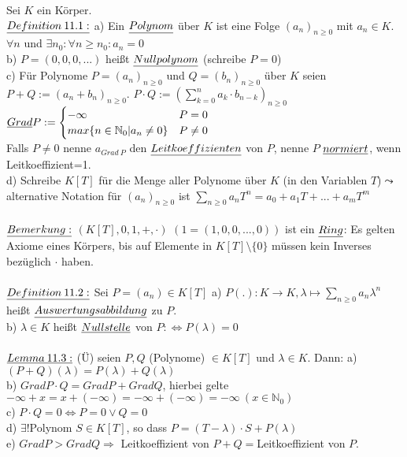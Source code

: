 \documentclass[fleqn, a4paper, 11pt]{scrartcl}
\newcommand{\NN}{\mathbb{N}}
\theoremstyle{definition}
\begin{document}
Sei $K$ ein Körper.\\
$\uline{Definition\:11.1:}$ a) Ein $\uline{Polynom}$ über $K$ ist eine Folge $(a_n)_{n\geq 0}$ mit $a_n\in K$. $\forall n$ und $\exists n_0 :\forall n\geq n_0: a_n=0$\\
b) $P=(0,0,0,...)$ heißt $\uline{Nullpolynom}$ (schreibe $P=0$)\\
c) Für Polynome $P=(a_n)_{n\geq 0}$ und $Q=(b_n)_{n\geq 0}$ über $K$ seien $P+Q:=(a_n +b_n)_{n\geq 0}$. $P\cdot Q:=(\sum\limits_{k=0}^n a_k\cdot b_{n-k})_{n\geq 0}$\\
$\uline{Grad}P:=\begin{cases}
	-\infty & P=0 \\
	max\{n\in\NN_0 | a_n\neq 0\} & P\neq 0
\end{cases}$\\
Falls $P\neq 0$ nenne $a_{Grad\:P}$ den $\uline{Leitkoeffizienten}$ von $P$, nenne $P$ $\uline{normiert}$, wenn Leitkoeffizient=1.\\
d) Schreibe $K[T]$ für die Menge aller Polynome über $K$ (in den Variablen $T$)$\leadsto$ alternative Notation für $(a_n)_{n\geq 0}$ ist $\sum\limits_{n\geq 0} a_n T^n =a_0 + a_1 T+...+a_m T^m$\\
\\
$\uline{Bemerkung:}$ $(K[T],0,1,+,\cdot)$ $(1=(1,0,0,...,0))$ ist ein $\uline{Ring}$: Es gelten Axiome eines Körpers, bis auf Elemente in $K[T]\setminus\{0\}$ müssen kein Inverses bezüglich $\cdot$ haben.\\
\\
$\uline{Definition\:11.2:}$ Sei $P=(a_n)\in K[T]$ a) $P(.):K\rightarrow K,\lambda\mapsto\sum\limits_{n\geq 0} a_n\lambda^n$ heißt $\uline{Auswertungsabbildung}$ zu $P$.\\
b) $\lambda\in K$ heißt $\uline{Nullstelle}$ von $P:\Leftrightarrow P(\lambda)=0$\\
\\
$\uline{Lemma\:11.3:}$ (\"U) seien $P,Q$ (Polynome) $\in K[T]$ und $\lambda\in K$. Dann: a) $(P+Q)(\lambda)=P(\lambda)+Q(\lambda)$\\
b) $Grad P\cdot Q=Grad P+Grad Q$, hierbei gelte $-\infty +x=x+(-\infty)=-\infty +(-\infty)=-\infty\:(x\in \NN_0)$\\
c) $P\cdot Q=0\Leftrightarrow P=0 \vee Q=0$\\
d) $\exists !$Polynom $S\in K[T]$, so dass $P=(T-\lambda)\cdot S+P(\lambda)$\\
e) $Grad P>Grad Q\Rightarrow$ Leitkoeffizient von $P+Q=$Leitkoeffizient von $P$.\\
\end{document}
